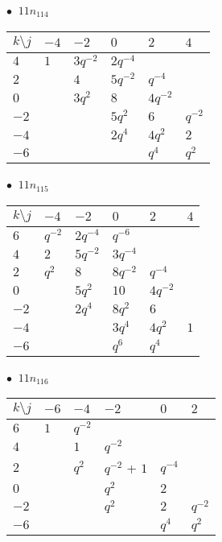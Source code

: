 %
\begin{minipage}{\linewidth}
$\bullet\ $ $11n_{114}$ \vspace{0.5em} \\
\begin{tabular}{l|lllll}
$k \setminus j$ & $-4$ & $-2$ & $0$ & $2$ & $4$ \\
\hline
$4$ & $1$ & $3q^{-2}$ & $2q^{-4}$ &  &  \\
$2$ &  & $4$ & $5q^{-2}$ & $q^{-4}$ &  \\
$0$ &  & $3q^{2}$ & $8$ & $4q^{-2}$ &  \\
$-2$ &  &  & $5q^{2}$ & $6$ & $q^{-2}$ \\
$-4$ &  &  & $2q^{4}$ & $4q^{2}$ & $2$ \\
$-6$ &  &  &  & $q^{4}$ & $q^{2}$ \\
\end{tabular}
\vspace{2em}
\end{minipage}
%
\begin{minipage}{\linewidth}
$\bullet\ $ $11n_{115}$ \vspace{0.5em} \\
\begin{tabular}{l|lllll}
$k \setminus j$ & $-4$ & $-2$ & $0$ & $2$ & $4$ \\
\hline
$6$ & $q^{-2}$ & $2q^{-4}$ & $q^{-6}$ &  &  \\
$4$ & $2$ & $5q^{-2}$ & $3q^{-4}$ &  &  \\
$2$ & $q^{2}$ & $8$ & $8q^{-2}$ & $q^{-4}$ &  \\
$0$ &  & $5q^{2}$ & $10$ & $4q^{-2}$ &  \\
$-2$ &  & $2q^{4}$ & $8q^{2}$ & $6$ &  \\
$-4$ &  &  & $3q^{4}$ & $4q^{2}$ & $1$ \\
$-6$ &  &  & $q^{6}$ & $q^{4}$ &  \\
\end{tabular}
\vspace{2em}
\end{minipage}
%
\begin{minipage}{\linewidth}
$\bullet\ $ $11n_{116}$ \vspace{0.5em} \\
\begin{tabular}{l|lllll}
$k \setminus j$ & $-6$ & $-4$ & $-2$ & $0$ & $2$ \\
\hline
$6$ & $1$ & $q^{-2}$ &  &  &  \\
$4$ &  & $1$ & $q^{-2}$ &  &  \\
$2$ &  & $q^{2}$ & $q^{-2}$ + $1$ & $q^{-4}$ &  \\
$0$ &  &  & $q^{2}$ & $2$ &  \\
$-2$ &  &  & $q^{2}$ & $2$ & $q^{-2}$ \\
$-6$ &  &  &  & $q^{4}$ & $q^{2}$ \\
\end{tabular}
\vspace{2em}
\end{minipage}
